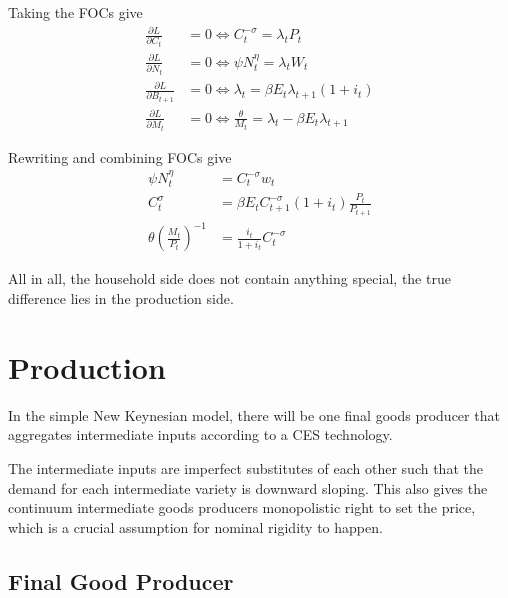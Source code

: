 \documentclass[twocolumn, fleqn]{article}
\begin{document}
	Taking the FOCs give
	\begin{align*}
		\frac{\partial L}{\partial C_t} &= 0 \iff C_t^{-\sigma} = \lambda_t P_t \\
		\frac{\partial L}{\partial N_t} &= 0 \iff \psi N_t^{\eta} = \lambda_t W_t \\
		\frac{\partial L}{\partial B_{t+1}} &= 0 \iff \lambda_t = \beta E_t \lambda_{t+1} (1 + i_t) \\
		\frac{\partial L}{\partial M_t} &= 0 \iff \frac{\theta}{M_t} = \lambda_t - \beta E_t \lambda_{t+1}
	\end{align*}
	
	Rewriting and combining FOCs give
	\begin{align}
		\psi N_t^\eta &= C_t^{-\sigma}w_t\\
		C_t^{\sigma} &= \beta E_t C_{t+1}^{-\sigma}(1+i_t) \frac{P_t}{P_{t+1}}\\
		\theta \left( \frac{M_t}{P_t}\right)^{-1} &= \frac{i_t}{1+i_t}C_t^{-\sigma}
	\end{align}
	
	All in all, the household side does not contain anything special, the true difference lies in the production side. 
	
	\section{Production}
	In the simple New Keynesian model, there will be one final goods producer that aggregates intermediate inputs according to a CES technology. 
	
	The intermediate inputs are imperfect substitutes of each other such that the demand for each intermediate variety is downward sloping. This also gives the continuum intermediate goods producers monopolistic right to set the price, which is a crucial assumption for nominal rigidity to happen.
	
	
	\subsection{Final Good Producer}
\end{document}
